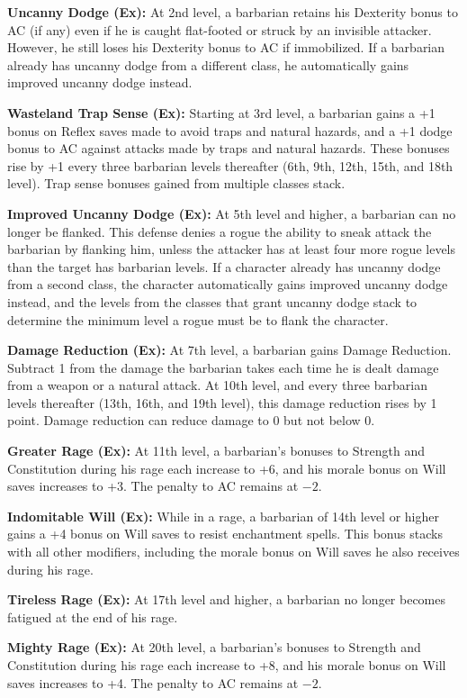 \textbf{Uncanny Dodge (Ex):} At 2nd level, a barbarian retains his Dexterity bonus to AC (if any) even if he is caught flat-footed or struck by an invisible attacker. However, he still loses his Dexterity bonus to AC if immobilized. If a barbarian already has uncanny dodge from a different class, he automatically gains improved uncanny dodge instead.

\textbf{Wasteland Trap Sense (Ex):} Starting at 3rd level, a barbarian gains a +1 bonus on Reflex saves made to avoid traps and natural hazards, and a +1 dodge bonus to AC against attacks made by traps and natural hazards. These bonuses rise by +1 every three barbarian levels thereafter (6th, 9th, 12th, 15th, and 18th level). Trap sense bonuses gained from multiple classes stack.

\textbf{Improved Uncanny Dodge (Ex):} At 5th level and higher, a barbarian can no longer be flanked. This defense denies a rogue the ability to sneak attack the barbarian by flanking him, unless the attacker has at least four more rogue levels than the target has barbarian levels. If a character already has uncanny dodge from a second class, the character automatically gains improved uncanny dodge instead, and the levels from the classes that grant uncanny dodge stack to determine the minimum level a rogue must be to flank the character.

\textbf{Damage Reduction (Ex):} At 7th level, a barbarian gains Damage Reduction. Subtract 1 from the damage the barbarian takes each time he is dealt damage from a weapon or a natural attack. At 10th level, and every three barbarian levels thereafter (13th, 16th, and 19th level), this damage reduction rises by 1 point. Damage reduction can reduce damage to 0 but not below 0.

\textbf{Greater Rage (Ex):} At 11th level, a barbarian's bonuses to Strength and Constitution during his rage each increase to +6, and his morale bonus on Will saves increases to +3. The penalty to AC remains at $-2$.

\textbf{Indomitable Will (Ex):} While in a rage, a barbarian of 14th level or higher gains a +4 bonus on Will saves to resist enchantment spells. This bonus stacks with all other modifiers, including the morale bonus on Will saves he also receives during his rage.

\textbf{Tireless Rage (Ex):} At 17th level and higher, a barbarian no longer becomes fatigued at the end of his rage.

\textbf{Mighty Rage (Ex):} At 20th level, a barbarian's bonuses to Strength and Constitution during his rage each increase to +8, and his morale bonus on Will saves increases to +4. The penalty to AC remains at $-2$.

